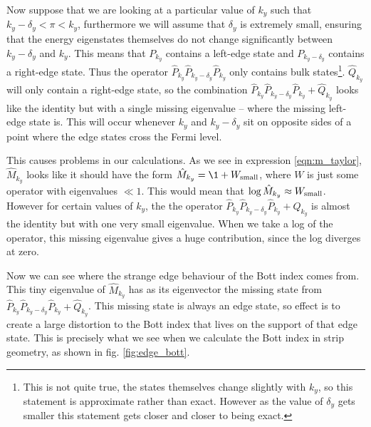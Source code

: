 Now suppose that we are looking at a particular value of $k_y$ such that $k_y - \delta_y < \pi < k_y$, furthermore we will assume that  $\delta_y$ is extremely small, ensuring that the energy eigenstates themselves do not change significantly between $k_y - \delta_y $ and $ k_y$. This means that $P_{k_y}$ contains a left-edge state and $P_{k_y-\delta_y}$ contains a right-edge state. Thus the operator $\hat P_{k_y} \hat P_{k_y - \delta_y} \hat P_{k_y}$ only contains bulk states\footnote{This is not quite true, the states themselves change slightly with $k_y$, so this statement is approximate rather than exact. However as the value of $\delta_y$ gets smaller this statement gets closer and closer to being exact.}. $\hat Q_{k_y}$ will only contain a right-edge state, so the combination $ \hat P_{k_y} \hat P_{k_y - \delta_y} \hat P_{k_y} + \hat Q_{k_y} $ looks like the identity but with a single missing eigenvalue -- where the missing left-edge state is. This will occur whenever $k_y$ and $k_y - \delta_y$ sit on opposite sides of a point where the edge states cross the Fermi level.\par
This causes problems in our calculations. As we see in expression \ref{eqn:m_taylor}, $\hat M_{k_y}$ looks like it should have the form $\hat M_{k_y} = \1 + W_{\textup{small}}$, where $W$ is just some operator with eigenvalues $\ll 1$. This would mean that $\log \hat M_{k_y} \approx W_{\textup{small}}$.  However for certain values of $k_y$, the the operator $ \hat P_{k_y} \hat P_{k_y - \delta_y} \hat P_{k_y} + \hat Q_{k_y}$ is almost the identity but with one very small eigenvalue. When we take a log of the operator, this missing eigenvalue gives a huge contribution, since the log diverges at zero. \par
Now we can see where the strange edge behaviour of the Bott index comes from. This tiny eigenvalue of $\hat M_{k_y}$ has as its eigenvector the missing state from $ \hat P_{k_y} \hat P_{k_y - \delta_y} \hat P_{k_y} + \hat Q_{k_y} $. This missing state is always an edge state, so effect is to create a large distortion to the Bott index that lives on the support of that edge state. This is precisely what we see when we calculate the Bott index in strip geometry, as shown in fig. \ref{fig:edge_bott}.
